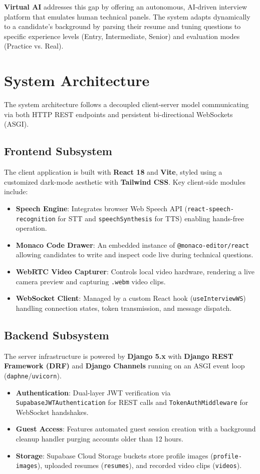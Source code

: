 \documentclass[twocolumn, 10pt, a4paper]{article}
\begin{document}
\textbf{Virtual AI} addresses this gap by offering an autonomous, AI-driven interview platform that emulates human technical panels. The system adapts dynamically to a candidate's background by parsing their resume and tuning questions to specific experience levels (Entry, Intermediate, Senior) and evaluation modes (Practice vs. Real).

\section{System Architecture}
The system architecture follows a decoupled client-server model communicating via both HTTP REST endpoints and persistent bi-directional WebSockets (ASGI).

\subsection{Frontend Subsystem}
The client application is built with \textbf{React 18} and \textbf{Vite}, styled using a customized dark-mode aesthetic with \textbf{Tailwind CSS}. Key client-side modules include:
\begin{itemize}
    \item \textbf{Speech Engine}: Integrates browser Web Speech API (\texttt{react-speech-recognition} for STT and \texttt{speechSynthesis} for TTS) enabling hands-free operation.
    \item \textbf{Monaco Code Drawer}: An embedded instance of \texttt{@monaco-editor/react} allowing candidates to write and inspect code live during technical questions.
    \item \textbf{WebRTC Video Capturer}: Controls local video hardware, rendering a live camera preview and capturing \texttt{.webm} video clips.
    \item \textbf{WebSocket Client}: Managed by a custom React hook (\texttt{useInterviewWS}) handling connection states, token transmission, and message dispatch.
\end{itemize}

\subsection{Backend Subsystem}
The server infrastructure is powered by \textbf{Django 5.x} with \textbf{Django REST Framework (DRF)} and \textbf{Django Channels} running on an ASGI event loop (\texttt{daphne}/\texttt{uvicorn}).
\begin{itemize}
    \item \textbf{Authentication}: Dual-layer JWT verification via \texttt{SupabaseJWTAuthentication} for REST calls and \texttt{TokenAuthMiddleware} for WebSocket handshakes.
    \item \textbf{Guest Access}: Features automated guest session creation with a background cleanup handler purging accounts older than 12 hours.
    \item \textbf{Storage}: Supabase Cloud Storage buckets store profile images (\texttt{profile-images}), uploaded resumes (\texttt{resumes}), and recorded video clips (\texttt{videos}).
\end{itemize}
\end{document}
